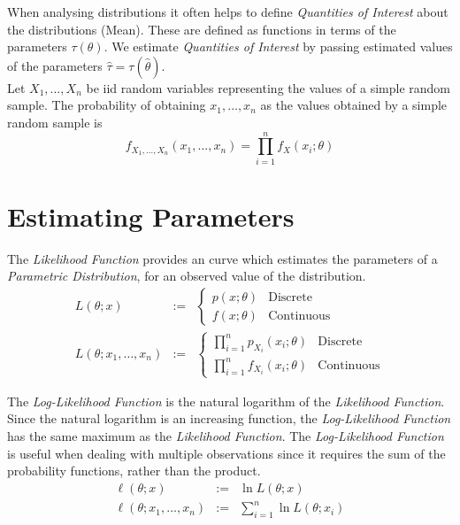 \documentclass[11pt,a4paper]{article}
\begin{document}
When analysing distributions it often helps to define \textit{Quantities of Interest} about the distributions (\eg Mean). These are defined as functions in terms of the parameters $\tau(\theta)$. We estimate \textit{Quantities of Interest} by passing estimated values of the parameters $\hat{\tau}=\tau(\hat{\theta})$.\\

Let $X_1,\dots,X_n$ be iid random variables representing the values of a simple random sample. The probability of obtaining $x_1,\dots,x_n$ as the values obtained by a simple random sample is
$$f_{X_1,\dots,X_n}(x_1,\dots,x_n)=\prod_{i=1}^nf_X(x_i;\theta)$$

\section{Estimating Parameters}

The \textit{Likelihood Function} provides an curve which estimates the parameters of a \textit{Parametric Distribution}, for an observed value of the distribution.
\[\begin{array}{rcl}
L(\theta;x)&:=&\begin{cases}p(x;\theta)&\mathrm{Discrete}\\f(x;\theta)&\mathrm{Continuous}\end{cases}\\
L(\theta;x_1,\dots,x_n)&:=&\begin{cases}\displaystyle{\prod_{i=1}^n p_{X_i}(x_i;\theta)}&\mathrm{Discrete}\\\displaystyle{\prod_{i=1}^n f_{X_i}(x_i;\theta)}&\mathrm{Continuous}\end{cases}
\end{array}\]

The \textit{Log-Likelihood Function} is the natural logarithm of the \textit{Likelihood Function}. Since the natural logarithm is an increasing function, the \textit{Log-Likelihood Function} has the same maximum as the \textit{Likelihood Function}. The \textit{Log-Likelihood Function} is useful when dealing with multiple observations since it requires the sum of the probability functions, rather than the product.
\[\begin{array}{rcl}
\ell(\theta;x)&:=&\ln L(\theta;x)\\
\ell(\theta;x_1,\dots,x_n)&:=&\displaystyle{\sum_{i=1}^n\ln L(\theta;x_i)}
\end{array}\]
\end{document}
